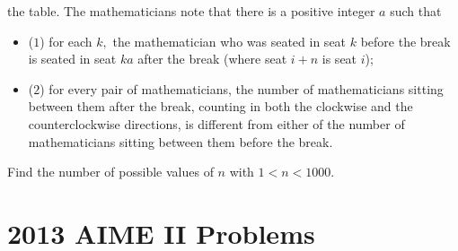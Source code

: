 \documentclass{article}
\begin{document}
\begin{enumerate}[label=\arabic*., itemsep=0.5em]
the table. The mathematicians note that there is a positive integer \(a\) such that

\begin{itemize}
\item (\(1\)) for each \(k,\) the mathematician who was seated in seat \(k\) before the break is seated in seat \(ka\) after the break (where seat \(i + n\) is seat \(i\));
\end{itemize}


\begin{itemize}
\item (\(2\)) for every pair of mathematicians, the number of mathematicians sitting between them after the break, counting in both the clockwise and the counterclockwise directions, is different from either of the number of mathematicians sitting between them before the break.
\end{itemize}


Find the number of possible values of \(n\) with \(1 < n < 1000.\)\par \vspace{0.5em}
\end{enumerate}
\newpage\section*{2013 AIME II Problems}
\end{document}
